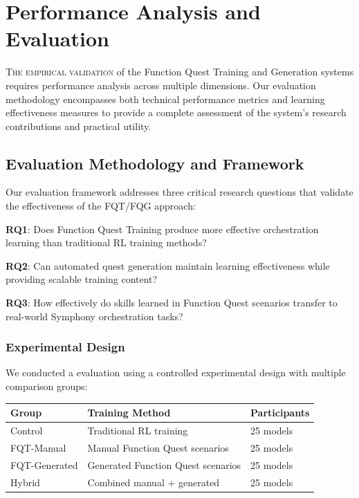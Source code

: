 
\section*{Performance Analysis and Evaluation}

\lettrine{T}{he empirical validation} of the Function Quest Training and Generation systems requires performance analysis across multiple dimensions. Our evaluation methodology encompasses both technical performance metrics and learning effectiveness measures to provide a complete assessment of the system's research contributions and practical utility.

\subsection*{Evaluation Methodology and Framework}

Our evaluation framework addresses three critical research questions that validate the effectiveness of the FQT/FQG approach:

\begin{expandedlist}
    \item \textbf{RQ1}: Does Function Quest Training produce more effective orchestration learning than traditional RL training methods?
    \item \textbf{RQ2}: Can automated quest generation maintain learning effectiveness while providing scalable training content?
    \item \textbf{RQ3}: How effectively do skills learned in Function Quest scenarios transfer to real-world Symphony orchestration tasks?
\end{expandedlist}

\subsubsection*{Experimental Design}

We conducted a evaluation using a controlled experimental design with multiple comparison groups:

\begin{center}
\begin{tabular}{@{}lll@{}}
\toprule
\textbf{Group} & \textbf{Training Method} & \textbf{Participants} \\
\midrule
Control & Traditional RL training & 25 models \\
FQT-Manual & Manual Function Quest scenarios & 25 models \\
FQT-Generated & Generated Function Quest scenarios & 25 models \\
Hybrid & Combined manual + generated & 25 models \\
\bottomrule
\end{tabular}
\end{center}

